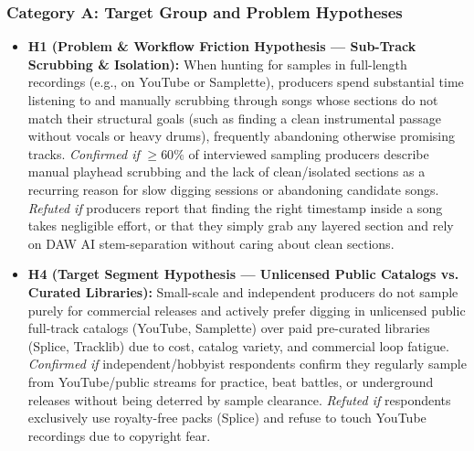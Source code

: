 \subsubsection*{Category A: Target Group and Problem Hypotheses}
\begin{itemize}
    \item \textbf{H1 (Problem \& Workflow Friction Hypothesis --- Sub-Track Scrubbing \& Isolation):} When hunting for samples in full-length recordings (e.g., on YouTube or Samplette), producers spend substantial time listening to and manually scrubbing through songs whose sections do not match their structural goals (such as finding a clean instrumental passage without vocals or heavy drums), frequently abandoning otherwise promising tracks. \textit{Confirmed if} $\ge 60\%$ of interviewed sampling producers describe manual playhead scrubbing and the lack of clean/isolated sections as a recurring reason for slow digging sessions or abandoning candidate songs. \textit{Refuted if} producers report that finding the right timestamp inside a song takes negligible effort, or that they simply grab any layered section and rely on DAW AI stem-separation without caring about clean sections.
    \item \textbf{H4 (Target Segment Hypothesis --- Unlicensed Public Catalogs vs. Curated Libraries):} Small-scale and independent producers do not sample purely for commercial releases and actively prefer digging in unlicensed public full-track catalogs (YouTube, Samplette) over paid pre-curated libraries (Splice, Tracklib) due to cost, catalog variety, and commercial loop fatigue. \textit{Confirmed if} independent/hobbyist respondents confirm they regularly sample from YouTube/public streams for practice, beat battles, or underground releases without being deterred by sample clearance. \textit{Refuted if} respondents exclusively use royalty-free packs (Splice) and refuse to touch YouTube recordings due to copyright fear.
\end{itemize}

